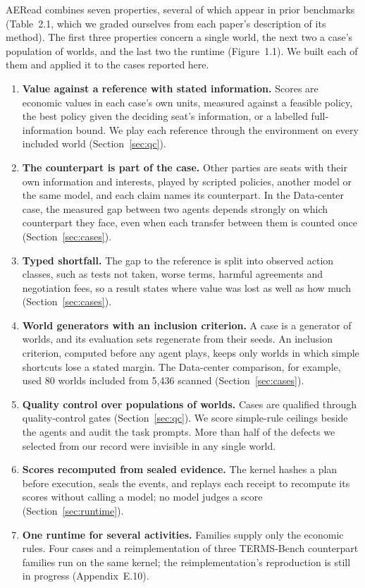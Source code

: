 AERead combines seven properties, several of which appear in prior
benchmarks (Table~2.1, which we graded ourselves from each paper's
description of its method). The first three
properties concern a single world, the next two a case's population of worlds, and the
last two the runtime (Figure~1.1). We built each of them and applied it to the
cases reported here.
\begin{enumerate}
\item \textbf{Value against a reference with stated information.} Scores
are economic values in each case's own units, measured against a feasible
policy, the best policy given the deciding seat's information, or a
labelled full-information bound. We play each reference through the
environment on every included world (Section~\ref{sec:qc}).
\item \textbf{The counterpart is part of the case.} Other parties are seats
with their own information and interests, played by scripted policies,
another model or the same model, and each claim names its counterpart. In
the Data-center case, the measured gap between two agents depends strongly on
which counterpart they face, even when each transfer between them is counted once
(Section~\ref{sec:cases}).
\item \textbf{Typed shortfall.} The gap to the reference is split into
observed action classes, such as tests not taken, worse terms, harmful
agreements and negotiation fees, so a result states where value was lost
as well as how much (Section~\ref{sec:cases}).
\item \textbf{World generators with an inclusion criterion.} A case is a generator of
worlds, and its evaluation sets regenerate from their seeds. An inclusion criterion,
computed before any agent plays, keeps only worlds in which simple
shortcuts lose a stated margin. The Data-center comparison, for example, used 80
worlds included from 5,436 scanned (Section~\ref{sec:cases}).
\item \textbf{Quality control over populations of worlds.} Cases are
qualified through quality-control gates (Section~\ref{sec:qc}). We score simple-rule ceilings beside the
agents and audit the task prompts. More than half of the defects we selected
from our record were invisible in any single world.
\item \textbf{Scores recomputed from sealed evidence.} The kernel hashes a
plan before execution, seals the events, and replays each receipt to
recompute its scores without calling a model; no model judges a score
(Section~\ref{sec:runtime}).
\item \textbf{One runtime for several activities.} Families supply only the
economic rules. Four cases and a reimplementation of three
TERMS-Bench counterpart families run on the same kernel; the
reimplementation's reproduction is still in progress (Appendix~E.10).
\end{enumerate}
